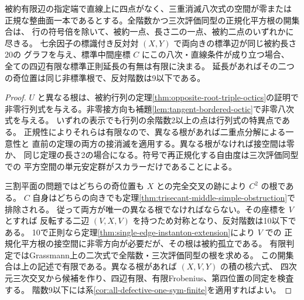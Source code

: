\begin{corollary}\label{cor:normal-triple-octic-root-length}
被約有限辺の指定端で直線上に四点がなく、三重消滅八次式の空間が零または
正規な整曲面一本であるとする。全階数かつ三次評価同型の正規化平方根の開集合は、
行の符号倍を除いて、被約一点、長さ二の一点、被約二点のいずれかに尽きる。
七余因子の標識付き反対対 $(X,Y)$ で両向きの標準辺が同じ被約長さ20の
グラフを与え、標準中間座標 $C$ にこの八次・直線条件が成り立つ場合、
全ての四辺有限な標準正則延長の有無は有限に決まる。
延長があればその二つの奇位置は同じ非標準根で、反対階数は9以下である。
\end{corollary}
\begin{proof}
$U$ と異なる根は、被約行列の定理\ref{thm:opposite-root-triple-octics}の証明で
非零行列式を与える。非零接方向も補題\ref{lem:tangent-bordered-octic}で非零八次式を与える。
いずれの表示でも行列の余階数2以上の点は行列式の特異点である。
正規性によりそれらは有限なので、異なる根があれば二重点分解による一意性と
直前の定理の両方の接消滅を適用する。異なる根がなければ接空間は零か、
同じ定理の長さ2の場合になる。符号で再正規化する自由度は三次評価同型での
平方空間の単元安定群がスカラーだけであることによる。

三割平面の問題ではどちらの奇位置も $X$ との完全交叉の跡により $C^2$ の根である。
$C$ 自身はどちらの向きでも定理\ref{thm:trisecant-middle-simple-obstruction}で排除される。
従って両方が唯一の異なる根でなければならない。その座標を $V$ とすれば
反転する二辺 $(V,X,V)$ を持つため対称となり、反対階数は10以下である。
10で正則なら定理\ref{thm:single-edge-instanton-extension}により $V$ での
正規化平方根の接空間に非零方向が必要だが、その根は被約孤立である。
有限判定ではGrassmann上の二次式で全階数・三次評価同型の根を求める。
この開集合は上の記述で有限である。異なる根があれば $(X,V,Y)$ の積の核六式、
四次元三次交叉から候補を作り、四辺有限、有限Frobenius、第四位置の同定を検査する。
階数9以下には系\ref{cor:all-defective-one-sym-finite}を適用すればよい。
\end{proof}

